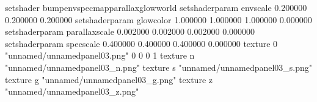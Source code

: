 setshader bumpenvspecmapparallaxglowworld
setshaderparam envscale 0.200000 0.200000 0.200000
setshaderparam glowcolor 1.000000 1.000000 1.000000 0.000000
setshaderparam parallaxscale 0.002000 0.002000 0.002000 0.000000
setshaderparam specscale 0.400000 0.400000 0.400000 0.000000
texture 0 "unnamed/unnamedpanel03.png" 0 0 0 1
texture n "unnamed/unnamedpanel03_n.png"
texture s "unnamed/unnamedpanel03_s.png"
texture g "unnamed/unnamedpanel03_g.png"
texture z "unnamed/unnamedpanel03_z.png"